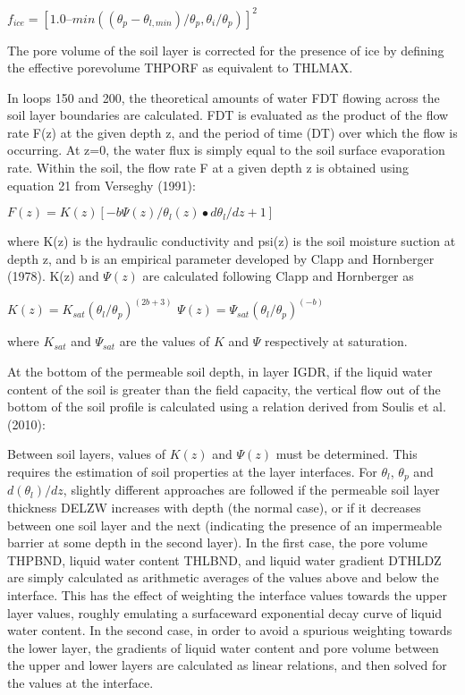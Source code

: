 $f_{ice} = [1.0 – min((\theta_p - \theta_{l,min} )/\theta_p , \theta_i / \theta_p )]^2$

The pore volume of the soil layer is corrected for the presence of ice by defining the effective porevolume T\+H\+P\+O\+R\+F as equivalent to T\+H\+L\+M\+A\+X.

In loops 150 and 200, the theoretical amounts of water F\+D\+T flowing across the soil layer boundaries are calculated. F\+D\+T is evaluated as the product of the flow rate F(z) at the given depth z, and the period of time (D\+T) over which the flow is occurring. At z=0, the water flux is simply equal to the soil surface evaporation rate. Within the soil, the flow rate F at a given depth z is obtained using equation 21 from Verseghy (1991)\+:

$F(z) = K(z) [-b \Psi(z)/\theta_l(z) \bullet d\theta_l / dz + 1]$

where K(z) is the hydraulic conductivity and psi(z) is the soil moisture suction at depth z, and b is an empirical parameter developed by Clapp and Hornberger (1978). K(z) and $\Psi(z)$ are calculated following Clapp and Hornberger as

$K(z) = K_{sat} (\theta_l/\theta_p)^{(2b + 3)}$ $\Psi(z) = \Psi_{sat} (\theta_l/\theta_p)^{(-b )}$

where $K_{sat}$ and $\Psi_{sat}$ are the values of $K$ and $\Psi$ respectively at saturation.

At the bottom of the permeable soil depth, in layer I\+G\+D\+R, if the liquid water content of the soil is greater than the field capacity, the vertical flow out of the bottom of the soil profile is calculated using a relation derived from Soulis et al. (2010)\+:

Between soil layers, values of $K(z)$ and $\Psi(z)$ must be determined. This requires the estimation of soil properties at the layer interfaces. For $\theta_l$, $\theta_p$ and $d(\theta_l)/dz$, slightly different approaches are followed if the permeable soil layer thickness D\+E\+L\+Z\+W increases with depth (the normal case), or if it decreases between one soil layer and the next (indicating the presence of an impermeable barrier at some depth in the second layer). In the first case, the pore volume T\+H\+P\+B\+N\+D, liquid water content T\+H\+L\+B\+N\+D, and liquid water gradient D\+T\+H\+L\+D\+Z are simply calculated as arithmetic averages of the values above and below the interface. This has the effect of weighting the interface values towards the upper layer values, roughly emulating a surfaceward exponential decay curve of liquid water content. In the second case, in order to avoid a spurious weighting towards the lower layer, the gradients of liquid water content and pore volume between the upper and lower layers are calculated as linear relations, and then solved for the values at the interface.

